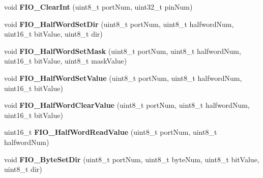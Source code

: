 \begin{DoxyCompactItemize}
\item 
\hypertarget{group___g_p_i_o___public___functions_ga5584613ec475b880574e80123648f9bc}{void {\bfseries \-F\-I\-O\-\_\-\-Clear\-Int} (uint8\-\_\-t port\-Num, uint32\-\_\-t pin\-Num)}\label{group___g_p_i_o___public___functions_ga5584613ec475b880574e80123648f9bc}

\item 
\hypertarget{group___g_p_i_o___public___functions_ga378164d8108e4334291764ea907f50b1}{void {\bfseries \-F\-I\-O\-\_\-\-Half\-Word\-Set\-Dir} (uint8\-\_\-t port\-Num, uint8\-\_\-t halfword\-Num, uint16\-\_\-t bit\-Value, uint8\-\_\-t dir)}\label{group___g_p_i_o___public___functions_ga378164d8108e4334291764ea907f50b1}

\item 
\hypertarget{group___g_p_i_o___public___functions_ga41fa62b0810082ee4336efc6b231c62f}{void {\bfseries \-F\-I\-O\-\_\-\-Half\-Word\-Set\-Mask} (uint8\-\_\-t port\-Num, uint8\-\_\-t halfword\-Num, uint16\-\_\-t bit\-Value, uint8\-\_\-t mask\-Value)}\label{group___g_p_i_o___public___functions_ga41fa62b0810082ee4336efc6b231c62f}

\item 
\hypertarget{group___g_p_i_o___public___functions_ga794b7ebf78d568cf05b8e1c63793825b}{void {\bfseries \-F\-I\-O\-\_\-\-Half\-Word\-Set\-Value} (uint8\-\_\-t port\-Num, uint8\-\_\-t halfword\-Num, uint16\-\_\-t bit\-Value)}\label{group___g_p_i_o___public___functions_ga794b7ebf78d568cf05b8e1c63793825b}

\item 
\hypertarget{group___g_p_i_o___public___functions_gab3900479f0525184ef060963b664ebb7}{void {\bfseries \-F\-I\-O\-\_\-\-Half\-Word\-Clear\-Value} (uint8\-\_\-t port\-Num, uint8\-\_\-t halfword\-Num, uint16\-\_\-t bit\-Value)}\label{group___g_p_i_o___public___functions_gab3900479f0525184ef060963b664ebb7}

\item 
\hypertarget{group___g_p_i_o___public___functions_ga0cd6aa5707c8da6fdb706adaf81d60f5}{uint16\-\_\-t {\bfseries \-F\-I\-O\-\_\-\-Half\-Word\-Read\-Value} (uint8\-\_\-t port\-Num, uint8\-\_\-t halfword\-Num)}\label{group___g_p_i_o___public___functions_ga0cd6aa5707c8da6fdb706adaf81d60f5}

\item 
\hypertarget{group___g_p_i_o___public___functions_ga58a215a79ef3d0786d093725c2c68ff6}{void {\bfseries \-F\-I\-O\-\_\-\-Byte\-Set\-Dir} (uint8\-\_\-t port\-Num, uint8\-\_\-t byte\-Num, uint8\-\_\-t bit\-Value, uint8\-\_\-t dir)}\label{group___g_p_i_o___public___functions_ga58a215a79ef3d0786d093725c2c68ff6}


\end{DoxyCompactItemize}

